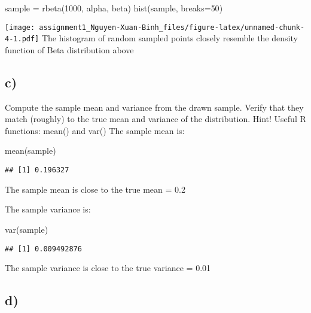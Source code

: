 \documentclass[
]{article}
\newenvironment{Shaded}{\begin{snugshade}}{\end{snugshade}}
\newcommand{\AttributeTok}[1]{\textcolor[rgb]{0.77,0.63,0.00}{#1}}
\newcommand{\DecValTok}[1]{\textcolor[rgb]{0.00,0.00,0.81}{#1}}
\newcommand{\FunctionTok}[1]{\textcolor[rgb]{0.00,0.00,0.00}{#1}}
\newcommand{\NormalTok}[1]{#1}
\newcommand{\OtherTok}[1]{\textcolor[rgb]{0.56,0.35,0.01}{#1}}
\begin{document}
\begin{Shaded}
\begin{Highlighting}[]
\NormalTok{sample }\OtherTok{=} \FunctionTok{rbeta}\NormalTok{(}\DecValTok{1000}\NormalTok{, alpha, beta)}
\FunctionTok{hist}\NormalTok{(sample, }\AttributeTok{breaks=}\DecValTok{50}\NormalTok{)}
\end{Highlighting}
\end{Shaded}

\texttt{[image: assignment1\_Nguyen-Xuan-Binh\_files/figure-latex/unnamed-chunk-4-1.pdf]}
The histogram of random sampled points closely resemble the density
function of Beta distribution above

\hypertarget{c}{%
\subsection{c)}\label{c}}

Compute the sample mean and variance from the drawn sample. Verify that
they match (roughly) to the true mean and variance of the distribution.
Hint! Useful R functions: mean() and var() The sample mean is:

\begin{Shaded}
\begin{Highlighting}[]
\FunctionTok{mean}\NormalTok{(sample)}
\end{Highlighting}
\end{Shaded}

\begin{verbatim}
## [1] 0.196327
\end{verbatim}

The sample mean is close to the true mean = 0.2

The sample variance is:

\begin{Shaded}
\begin{Highlighting}[]
\FunctionTok{var}\NormalTok{(sample)}
\end{Highlighting}
\end{Shaded}

\begin{verbatim}
## [1] 0.009492876
\end{verbatim}

The sample variance is close to the true variance = 0.01

\hypertarget{d}{%
\subsection{d)}\label{d}}
\end{document}
